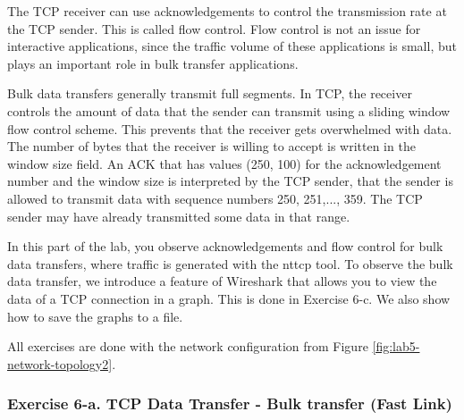 The TCP receiver can use acknowledgements to control the transmission rate at the TCP sender. This is called flow control. Flow control is not an issue for interactive applications, since the traffic volume of these applications is small, but plays an important role in bulk transfer applications.

Bulk data transfers generally transmit full segments. In TCP, the receiver controls the amount of data that the sender can transmit using a sliding window flow control scheme. This prevents that the receiver gets overwhelmed with data. The number of bytes that the receiver is willing to accept is written in the window size field. An ACK that has values (250, 100) for the acknowledgement number and the window size is interpreted by the TCP sender, that the sender is allowed to transmit data with sequence numbers 250, 251,..., 359. The TCP sender may have already transmitted some data in that range.

In this part of the lab, you observe acknowledgements and flow control for bulk data transfers, where traffic is generated with the nttcp tool. To observe the bulk data transfer, we introduce a feature of Wireshark that allows you to view the data of a TCP connection in a graph. This is done in Exercise 6-c. We also show how to save the graphs to a file.

All exercises are done with the network configuration from Figure \ref{fig:lab5-network-topology2}.

\subsubsection{Exercise 6-a. TCP Data Transfer - Bulk transfer (Fast Link)}

